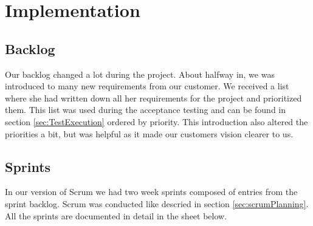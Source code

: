 \section{Implementation}
\thispagestyle{plain}

\subsection{Backlog}

Our backlog changed a lot during the project. About halfway in, we was introduced to many new requirements from our customer. We received a list where she had written down all her requirements for the project and prioritized them. This list was used during the acceptance testing and can be found in section \ref{sec:TestExecution} ordered by priority. This introduction also altered the priorities a bit, but was helpful as it made our customers vision clearer to us.




\subsection{Sprints}

In our version of Scrum we had two week sprints composed of entries from the sprint backlog. Scrum was conducted like descried in section \ref{sec:scrumPlanning}.
All the sprints are documented in detail in the sheet below.





